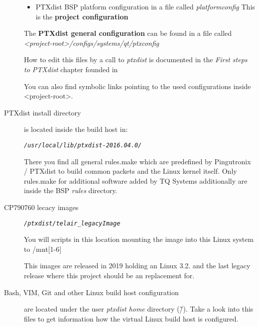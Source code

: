 \begin{description}
\begin{itemize}
    \item PTXdist BSP platform configuration in a file
        called \textit{platformconfig} This is the
        \textbf{project configuration}
         \end{itemize}
        The \textbf{PTXdist general configuration} can be found in a file called
        \newline \textit{<project-root>/configs/systems/qt/ptxconfig}

         How to edit this files by a call to \textit{ptxdist} is documented in
         the \textit{First steps to PTXdist} chapter founded \newline
         in~\cite[PTXDist online documentation]{ptxdist_docu}

        You can also find symbolic links pointing to the used configurations
        inside <project-root>.

    \item[PTXdist install directory] is located inside the build host in:
        \begin{alltt}
        \newline \textit{/usr/local/lib/ptxdist-2016.04.0/}
        \end{alltt}
        There you find all general rules.make which are predefined by
        Pingutronix / PTXdist to build common packets and the Linux kernel
        itself. Only rules.make for additional software added by TQ Systems
        additionally are inside the BSP \textit{rules} directory.

    \item[CP790760 lecacy images]
        \begin{alltt}
            \textit{/ptxdist/telair_legacyImage}
        \end{alltt}

        You will scripts in this location mounting the image into this Linux
        system to /mnt[1-6]

        This images are released in 2019 holding an Linux 3.2. and the last
        legacy release where this project should be an replacement for.

    \item[Bash, VIM, Git and other Linux build host configuration] are located
        under the user \textit{ptxdist home} directory (\~/). Take a look into
        this files to get information how the virtual Linux build host is
        configured.
\end{description}

